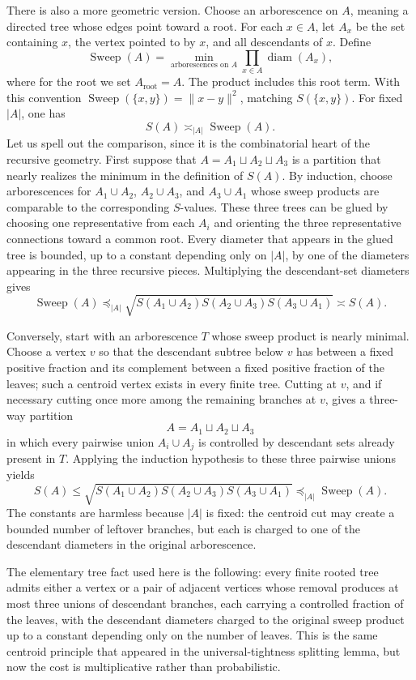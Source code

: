 \documentclass[11pt,reqno]{book}
\numberwithin{equation}{chapter}
\theoremstyle{plain}
\theoremstyle{definition}
\theoremstyle{remark}
\newcommand{\1}{\mathbf 1}
\newcommand{\norm}[1]{\lVert #1\rVert}
\newcommand{\pre}{\preceq}
\begin{document}
There is also a more geometric version. Choose an arborescence on $A$, meaning a directed tree whose edges point toward a root. For each $x\in A$, let $A_x$ be the set containing $x$, the vertex pointed to by $x$, and all descendants of $x$. Define
\[
  \operatorname{Sweep}(A)
  =
  \min_{\text{arborescences on }A}
  \prod_{x\in A}\operatorname{diam}(A_x),
\]
where for the root we set \(A_{\mathrm{root}}=A\). The product includes this
root term. With this convention
\(\operatorname{Sweep}(\{x,y\})=\norm{x-y}^2\), matching
\(S(\{x,y\})\).
For fixed $|A|$, one has
\[
  S(A)\asymp_{|A|}\operatorname{Sweep}(A).
\]
Let us spell out the comparison, since it is the combinatorial heart of the
recursive geometry. First suppose that \(A=A_1\sqcup A_2\sqcup A_3\) is a
partition that nearly realizes the minimum in the definition of \(S(A)\).
By induction, choose arborescences for
\(A_1\cup A_2\), \(A_2\cup A_3\), and \(A_3\cup A_1\) whose sweep products
are comparable to the corresponding \(S\)-values. These three trees can be
glued by choosing one representative from each \(A_i\) and orienting the
three representative connections toward a common root. Every diameter that
appears in the glued tree is bounded, up to a constant depending only on
\(|A|\), by one of the diameters appearing in the three recursive pieces.
Multiplying the descendant-set diameters gives
\[
  \operatorname{Sweep}(A)
  \pre_{|A|}
  \sqrt{
    S(A_1\cup A_2)
    S(A_2\cup A_3)
    S(A_3\cup A_1)
  }
  \asymp S(A).
\]

Conversely, start with an arborescence \(T\) whose sweep product is nearly
minimal. Choose a vertex \(v\) so that the descendant subtree below \(v\) has
between a fixed positive fraction and its complement between a fixed positive
fraction of the leaves; such a centroid vertex exists in every finite tree.
Cutting at \(v\), and if necessary cutting once more among the remaining
branches at \(v\), gives a three-way partition
\[
  A=A_1\sqcup A_2\sqcup A_3
\]
in which every pairwise union \(A_i\cup A_j\) is controlled by descendant
sets already present in \(T\). Applying the induction hypothesis to these
three pairwise unions yields
\[
  S(A)
  \leq
  \sqrt{
    S(A_1\cup A_2)
    S(A_2\cup A_3)
    S(A_3\cup A_1)
  }
  \pre_{|A|}
  \operatorname{Sweep}(A).
\]
The constants are harmless because \(|A|\) is fixed: the centroid cut may
create a bounded number of leftover branches, but each is charged to one of
the descendant diameters in the original arborescence.

The elementary tree fact used here is the following: every finite rooted tree
admits either a vertex or a pair of adjacent vertices whose removal produces
at most three unions of descendant branches, each carrying a controlled
fraction of the leaves, with the descendant diameters charged to the original
sweep product up to a constant depending only on the number of leaves. This
is the same centroid principle that appeared in the universal-tightness
splitting lemma, but now the cost is multiplicative rather than probabilistic.
\end{document}
